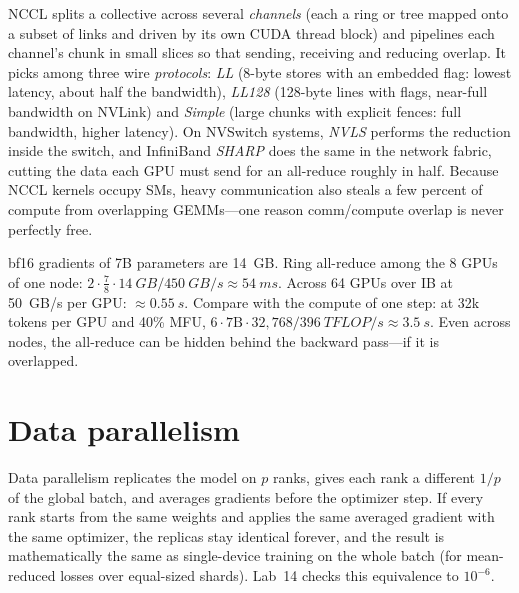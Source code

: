 \begin{deepdive}
NCCL splits a collective across several \emph{channels} (each a ring or tree mapped onto a
subset of links and driven by its own CUDA thread block) and pipelines each channel's chunk in
small slices so that sending, receiving and reducing overlap. It picks among three wire
\emph{protocols}: \emph{LL} (8-byte stores with an embedded flag: lowest latency, about half the
bandwidth), \emph{LL128} (128-byte lines with flags, near-full bandwidth on NVLink) and
\emph{Simple} (large chunks with explicit fences: full bandwidth, higher latency). On NVSwitch
systems, \emph{NVLS} performs the reduction inside the switch, and InfiniBand \emph{SHARP} does
the same in the network fabric, cutting the data each GPU must send for an all-reduce roughly in
half. Because NCCL kernels occupy SMs, heavy communication also steals a few percent of compute
from overlapping GEMMs---one reason comm/compute overlap is never perfectly free.
\end{deepdive}

\begin{napkinmath}
bf16 gradients of 7B parameters are \SI{14}{GB}. Ring all-reduce among the 8 GPUs of one node:
$2\cdot\frac78\cdot\SI{14}{GB}/\SI{450}{GB/s}\approx\SI{54}{ms}$. Across 64 GPUs over IB at
\SI{50}{GB/s} per GPU: $\approx\SI{0.55}{s}$. Compare with the compute of one step: at 32k
tokens per GPU and 40\% MFU, $6\cdot7\text{B}\cdot32{,}768/\SI{396}{TFLOP/s}\approx\SI{3.5}{s}$.
Even across nodes, the all-reduce can be hidden behind the backward pass---if it is overlapped.
\end{napkinmath}

\section{Data parallelism}\label{sec:dist:dp}

Data parallelism replicates the model on $p$ ranks, gives each rank a different $1/p$ of the
global batch, and averages gradients before the optimizer step. If every rank starts from the
same weights and applies the same averaged gradient with the same optimizer, the replicas stay
identical forever, and the result is mathematically the same as single-device training on the
whole batch (for mean-reduced losses over equal-sized shards). Lab~14 checks this equivalence
to $10^{-6}$.

